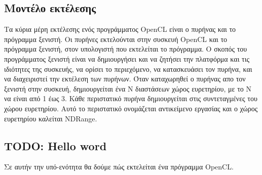 \subsection{Μοντέλο εκτέλεσης}
Τα κύρια μέρη εκτέλεσης ενός προγράμματος OpenCL είναι ο πυρήνας και το πρόγραμμα ξενιστή. Οι πυρήνες εκτελούνται στην συσκευή OpenCL και το πρόγραμμα ξενιστή, στον υπολογιστή που εκτελείται το πρόγραμμα. Ο σκοπός του προγράμματος ξενιστή είναι να δημιουργήσει και να ζητήσει την πλατφόρμα και τις ιδιότητες της συσκευής, να ορίσει το περιεχόμενο, να κατασκευάσει τον πυρήνα, και να διαχειριστεί την εκτέλεση των πυρήνων. Όταν καταχωρηθεί ο πυρήνας απο τον ξενιστή στην συσκευή, δημιουργείται ένα Ν διαστάσεων χώρος ευρετηρίου, με το Ν να είναι από 1 έως 3. Κάθε περιστατικό πυρήνα δημιουργείται στις συντεταγμένες του χώρου ευρετηρίου. Αυτό το περιστατικό ονομάζεται αντικείμενο εργασίας και ο χώρος ευρετηρίου καλείται NDRange.
\subsection{TODO: Hello word}
Σε αυτήν την υπό-ενότητα θα δούμε πώς εκτελείται ένα πρόγραμμα OpenCL.





